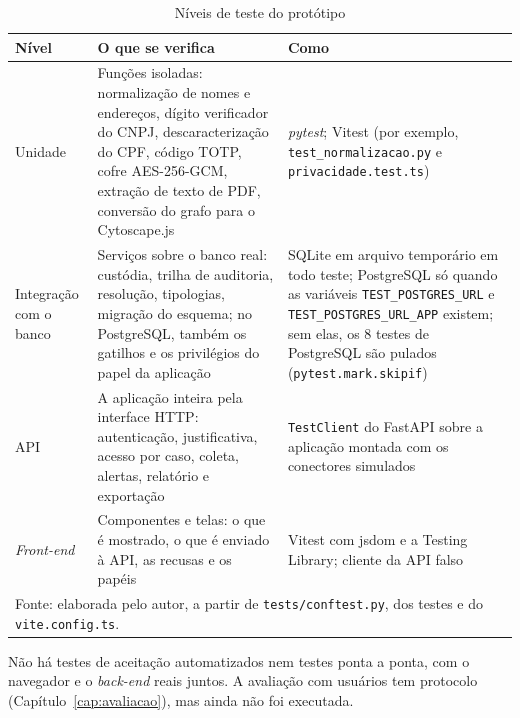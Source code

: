 \begin{small}
\begin{longtable}{p{2.6cm}p{5.6cm}p{6.2cm}}
\caption{Níveis de teste do protótipo}\label{tab:niveis-teste}\\
\hline
\textbf{Nível} & \textbf{O que se verifica} & \textbf{Como} \\ \hline\endhead
Unidade & Funções isoladas: normalização de nomes e endereços, dígito verificador do CNPJ, descaracterização do CPF, código TOTP, cofre AES-256-GCM, extração de texto de PDF, conversão do grafo para o Cytoscape.js & \textit{pytest}; Vitest (por exemplo, \texttt{test\_normalizacao.py} e \texttt{privacidade.test.ts}) \\
Integração com o banco & Serviços sobre o banco real: custódia, trilha de auditoria, resolução, tipologias, migração do esquema; no PostgreSQL, também os gatilhos e os privilégios do papel da aplicação & SQLite em arquivo temporário em todo teste; PostgreSQL só quando as variáveis \texttt{TEST\_POSTGRES\_URL} e \texttt{TEST\_POSTGRES\_URL\_APP} existem; sem elas, os 8 testes de PostgreSQL são pulados (\texttt{pytest.mark.skipif}) \\
API & A aplicação inteira pela interface HTTP: autenticação, justificativa, acesso por caso, coleta, alertas, relatório e exportação & \texttt{TestClient} do FastAPI sobre a aplicação montada com os conectores simulados \\
\textit{Front-end} & Componentes e telas: o que é mostrado, o que é enviado à API, as recusas e os papéis & Vitest com jsdom e a Testing Library; cliente da API falso \\
\hline
\multicolumn{3}{p{14.4cm}}{\footnotesize Fonte: elaborada pelo autor, a partir de \texttt{tests/conftest.py}, dos testes e do \texttt{vite.config.ts}.}\\
\end{longtable}
\end{small}

Não há testes de aceitação automatizados nem testes ponta a ponta, com o
navegador e o \textit{back-end} reais juntos. A avaliação com usuários tem
protocolo (Capítulo~\ref{cap:avaliacao}), mas ainda não foi executada.

